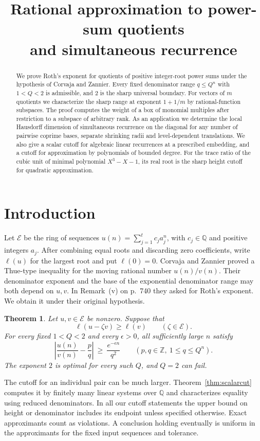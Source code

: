 \documentclass[11pt,a4paper,reqno]{amsart}
\title[Power-sum quotients and simultaneous recurrence]{Rational approximation to power-sum quotients\\and simultaneous recurrence}
\date{}
\newtheorem{theorem}{Theorem}[section]
\theoremstyle{definition}
\theoremstyle{remark}
\numberwithin{equation}{section}
\begin{document}
\begin{abstract}
We prove Roth's exponent for quotients of positive integer-root power sums under the hypothesis of Corvaja and Zannier. Every fixed denominator range \(q\le Q^n\) with \(1<Q<2\) is admissible, and \(2\) is the sharp universal boundary. For vectors of \(m\) quotients we characterize the sharp range at exponent \(1+1/m\) by rational-function subspaces. The proof computes the weight of a box of monomial multiples after restriction to a subspace of arbitrary rank. As an application we determine the local Hausdorff dimension of simultaneous recurrence on the diagonal for any number of pairwise coprime bases, separate shrinking radii and level-dependent translations. We also give a scalar cutoff for algebraic linear recurrences at a prescribed embedding, and a cutoff for approximation by polynomials of bounded degree. For the trace ratio of the cubic unit of minimal polynomial \(X^3-X-1\), its real root is the sharp height cutoff for quadratic approximation.
\end{abstract}
\maketitle
\tableofcontents

\section{Introduction}
Let \(\mathcal E\) be the ring of sequences \(u(n)=\sum_{j=1}^t c_j a_j^n\), with \(c_j\in\mathbb Q\) and positive integers \(a_j\). After combining equal roots and discarding zero coefficients, write \(\ell(u)\) for the largest root and put \(\ell(0)=0\). Corvaja and Zannier \cite[pp.~738--740]{CZ05} proved a Thue-type inequality for the moving rational number \(u(n)/v(n)\). Their denominator exponent and the base of the exponential denominator range may both depend on \(u,v\). In Remark~(v) on p.~740 they asked for Roth's exponent. We obtain it under their original hypothesis.
\begin{theorem}\label{thm:cz}
Let \(u,v\in\mathcal E\) be nonzero. Suppose that
\begin{equation}\label{eq:czhyp}
                 \ell(u-\zeta v)\ge\ell(v)\qquad(\zeta\in\mathcal E).
\end{equation}
For every fixed \(1<Q<2\) and every \(\epsilon>0\), all sufficiently large \(n\) satisfy
\[
 \left|\frac{u(n)}{v(n)}-\frac pq\right|\ \ge\ \frac{e^{-\epsilon n}}{q^2}
 \qquad(p,q\in\mathbb Z,\ 1\le q\le Q^n).
\]
The exponent \(2\) is optimal for every such \(Q\), and \(Q=2\) can fail.
\end{theorem}
The cutoff for an individual pair can be much larger. Theorem~\ref{thm:scalarcut} computes it by finitely many linear systems over \(\mathbb Q\) and characterizes equality using reduced denominators. In all our cutoff statements the upper bound on height or denominator includes its endpoint unless specified otherwise. Exact approximants count as violations. A conclusion holding eventually is uniform in the approximants for the fixed input sequences and tolerance.
\end{document}
